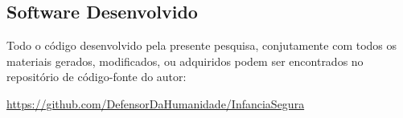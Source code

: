 \begin{apendicesenv}
\hspace{-1.6cm}




\chapter{Software Desenvolvido}\label{chap:codigo}

Todo o código desenvolvido pela presente pesquisa, conjutamente com todos os materiais gerados, modificados, ou adquiridos podem ser encontrados no repositório de código-fonte do autor:

\url{https://github.com/DefensorDaHumanidade/InfanciaSegura}

\end{apendicesenv}
